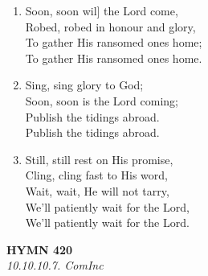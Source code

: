 \documentclass[11pt,a4paper]{article}
\begin{document}
\begin{enumerate}
    \item Soon, soon wil] the Lord come, \\
        Robed, robed in honour and glory, \\
        To gather His ransomed ones home; \\
        To gather His ransomed ones home.

    \item Sing, sing glory to God; \\
        Soon, soon is the Lord coming; \\
        Publish the tidings abroad. \\
        Publish the tidings abroad.

    \item Still, still rest on His promise, \\
        Cling, cling fast to His word, \\
        Wait, wait, He will not tarry, \\
        We'll patiently wait for the Lord, \\
        We'll patiently wait for the Lord.

\end{enumerate}

\newpage
\begin{center}
    {\Large \textbf{HYMN 420}}
    \\
    \textit{10.10.10.7. ComInc}
\end{center}
\vspace{1em}
\end{document}
